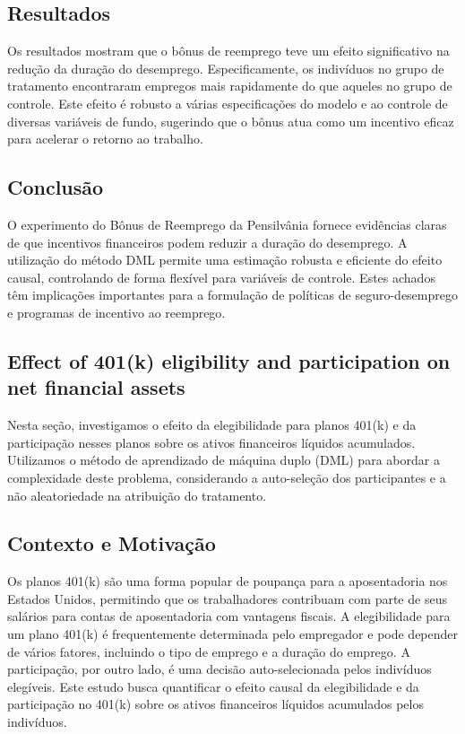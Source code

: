 \documentclass[a4paper,12pt]{article}[abntex2]
\begin{document}
\subsection*{Resultados}

Os resultados mostram que o bônus de reemprego teve um efeito significativo na redução da duração do desemprego. Especificamente, os indivíduos no grupo de tratamento encontraram empregos mais rapidamente do que aqueles no grupo de controle. Este efeito é robusto a várias especificações do modelo e ao controle de diversas variáveis de fundo, sugerindo que o bônus atua como um incentivo eficaz para acelerar o retorno ao trabalho.

\subsection*{Conclusão}

O experimento do Bônus de Reemprego da Pensilvânia fornece evidências claras de que incentivos financeiros podem reduzir a duração do desemprego. A utilização do método DML permite uma estimação robusta e eficiente do efeito causal, controlando de forma flexível para variáveis de controle. Estes achados têm implicações importantes para a formulação de políticas de seguro-desemprego e programas de incentivo ao reemprego.

\subsection{Effect of 401(k) eligibility and participation on net ﬁnancial assets}

Nesta seção, investigamos o efeito da elegibilidade para planos 401(k) e da participação nesses planos sobre os ativos financeiros líquidos acumulados. Utilizamos o método de aprendizado de máquina duplo (DML) para abordar a complexidade deste problema, considerando a auto-seleção dos participantes e a não aleatoriedade na atribuição do tratamento.

\subsection*{Contexto e Motivação}

Os planos 401(k) são uma forma popular de poupança para a aposentadoria nos Estados Unidos, permitindo que os trabalhadores contribuam com parte de seus salários para contas de aposentadoria com vantagens fiscais. A elegibilidade para um plano 401(k) é frequentemente determinada pelo empregador e pode depender de vários fatores, incluindo o tipo de emprego e a duração do emprego. A participação, por outro lado, é uma decisão auto-selecionada pelos indivíduos elegíveis. Este estudo busca quantificar o efeito causal da elegibilidade e da participação no 401(k) sobre os ativos financeiros líquidos acumulados pelos indivíduos.
\end{document}

